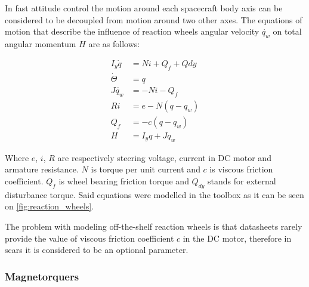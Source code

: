         In fast attitude control the motion around each spacecraft body axis can be considered to be decoupled from motion around two other axes. The equations of motion that describe the influence of reaction wheels angular velocity $\dot{q_w}$ on total angular momentum $H$ are as follows:
        
        \begin{align}
            I_y\dot{q} &= Ni+Q_f+Qdy\\
            \dot{\Theta} &= q\\
            J\dot{q_w} &= -Ni-Q_f\\
            Ri &= e - N(q-q_w)\\
            Q_f &= -c(q-q_w)\\
            H &= I_yq + Jq_w
        \end{align}

        Where $e$, $i$, $R$ are respectively steering voltage, current in DC motor and armature resistance. $N$ is torque per unit current and $c$ is viscous friction coefficient. $Q_f$ is wheel bearing friction torque and $Q_{dy}$ stands for external disturbance torque. Said equations were modelled in the toolbox as it can be seen on \autoref{fig:reaction_wheels}. 

        The problem with modeling off-the-shelf reaction wheels is that datasheets rarely provide the value of viscous friction coefficient $c$ in the DC motor, therefore in \ac{scars} it is considered to be an optional parameter. 
        
        
        



    \subsubsection{Magnetorquers}\label{sec:magnetorquer}

